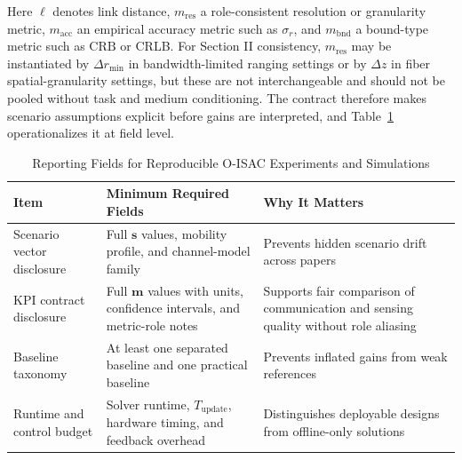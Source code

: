 \documentclass[letterpaper,journal]{IEEEtran}
\begin{document}
Here $\ell$ denotes link distance, $m_{\text{res}}$ a role-consistent resolution or granularity metric, $m_{\text{acc}}$ an empirical accuracy metric such as $\sigma_r$, and $m_{\text{bnd}}$ a bound-type metric such as $\mathrm{CRB}$ or CRLB. For Section II consistency, $m_{\text{res}}$ may be instantiated by $\Delta r_{\min}$ in bandwidth-limited ranging settings or by $\Delta z$ in fiber spatial-granularity settings, but these are not interchangeable and should not be pooled without task and medium conditioning. The contract therefore makes scenario assumptions explicit before gains are interpreted, and Table~\ref{tab:vi_d_reporting} operationalizes it at field level.

\begin{table}[!t]
    \caption{Reporting Fields for Reproducible O-ISAC Experiments and Simulations}
    \label{tab:vi_d_reporting}
    \centering
    \footnotesize
    \begin{tabularx}{\columnwidth}{@{}>{\raggedright\arraybackslash}p{2.35cm}>{\raggedright\arraybackslash}X>{\raggedright\arraybackslash}X@{}}
        \toprule
        \textbf{Item}                                                                    & \textbf{Minimum Required Fields} & \textbf{Why It Matters} \\
        \midrule
        Scenario vector disclosure                                                       &
        Full $\mathbf{s}$ values, mobility profile, and channel-model family             &
        Prevents hidden scenario drift across papers                                                                                                  \\

        KPI contract disclosure                                                          &
        Full $\mathbf{m}$ values with units, confidence intervals, and metric-role notes &
        Supports fair comparison of communication and sensing quality without role aliasing                                                           \\

        Baseline taxonomy                                                                &
        At least one separated baseline and one practical baseline                       &
        Prevents inflated gains from weak references                                                                                                  \\

        Runtime and control budget                                                       &
        Solver runtime, $T_{\text{update}}$, hardware timing, and feedback overhead      &
        Distinguishes deployable designs from offline-only solutions                                                                                  \\


\end{tabularx}
\end{table}
\end{document}

